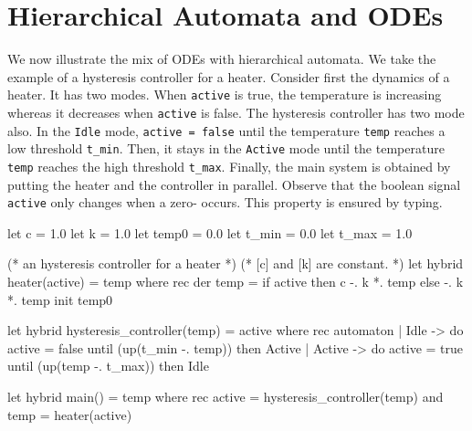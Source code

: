 \documentclass[11pt,titlepage,twoside]{report}
\makeatletter
\newcommand{\zls}[1]{{\@span{class="zelusinline"}#1}}
\newcommand{\zls}[1]{\texttt{#1}}
\renewcommand{\zls}[1]{\texttt{#1}}
\newcommand{\Marc}[1]{{\bf Marc.} {#1} {\bf Fin}}
\makeatother
\begin{document}
\section{Hierarchical Automata and ODEs\label{hautoodes}} %

We now illustrate the mix of ODEs with hierarchical automata. We take
the example of a hysteresis controller for a heater.  Consider first
the dynamics of a heater. It has two modes. When \zls{active} is true,
the temperature is increasing whereas it decreases when
\zls{active} is false. The hysteresis controller has two mode also. In the
\zls{Idle} mode, \zls{active = false} until the temperature
\zls{temp} reaches a low threshold \zls{t\_min}. Then, it stays in
the \zls{Active} mode until the temperature \zls{temp} reaches the
high threshold \zls{t\_max}. Finally, the main system is obtained by
putting the heater and the controller in parallel. Observe that the
boolean signal \zls{active} only changes when a zero-
occurs. This property is ensured by typing.
%
%
%
%
%
%
%
\begin{chklisting}
let c = 1.0
let k = 1.0
let temp0 = 0.0
let t_min = 0.0
let t_max = 1.0
\end{chklisting}
\begin{chklisting}[continue]
(* an hysteresis controller for a heater *)
(* [c] and [k] are constant. *)
let hybrid heater(active) = temp where
  rec der temp = if active then c -. k *. temp else -. k *. temp init temp0

let hybrid hysteresis_controller(temp) = active where
  rec automaton
      | Idle -> do active = false until (up(t_min -. temp)) then Active
      | Active -> do active = true until (up(temp -. t_max)) then Idle
 
let hybrid main() = temp where
  rec active = hysteresis_controller(temp)
  and temp = heater(active)
\end{chklisting}
\end{document}
